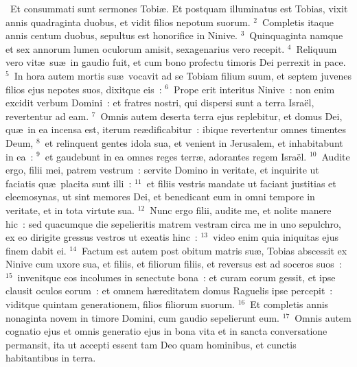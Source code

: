 ~Et consummati sunt sermones Tobi\ae . Et postquam illuminatus est Tobias, vixit annis quadraginta duobus, et vidit filios nepotum suorum.
${}^{2}$~Completis itaque annis centum duobus, sepultus est honorifice in Ninive.
${}^{3}$~Quinquaginta namque et sex annorum lumen oculorum amisit, sexagenarius vero recepit.
${}^{4}$~Reliquum vero vit\ae\ su\ae\ in gaudio fuit, et cum bono profectu timoris Dei perrexit in pace.
${}^{5}$~In hora autem mortis su\ae\ vocavit ad se Tobiam filium suum, et septem juvenes filios ejus nepotes suos, dixitque eis~:
${}^{6}$~Prope erit interitus Ninive~: non enim excidit verbum Domini~: et fratres nostri, qui dispersi sunt a terra Isra\"el, revertentur ad eam.
${}^{7}$~Omnis autem deserta terra ejus replebitur, et domus Dei, qu\ae\ in ea incensa est, iterum re\ae dificabitur~: ibique revertentur omnes timentes Deum,
${}^{8}$~et relinquent gentes idola sua, et venient in Jerusalem, et inhabitabunt in ea~:
${}^{9}$~et gaudebunt in ea omnes reges terr\ae , adorantes regem Isra\"el.
${}^{10}$~Audite ergo, filii mei, patrem vestrum~: servite Domino in veritate, et inquirite ut faciatis qu\ae\ placita sunt illi~:
${}^{11}$~et filiis vestris mandate ut faciant justitias et eleemosynas, ut sint memores Dei, et benedicant eum in omni tempore in veritate, et in tota virtute sua.
${}^{12}$~Nunc ergo filii, audite me, et nolite manere hic~: sed quacumque die sepelieritis matrem vestram circa me in uno sepulchro, ex eo dirigite gressus vestros ut exeatis hinc~:
${}^{13}$~video enim quia iniquitas ejus finem dabit ei.
${}^{14}$~Factum est autem post obitum matris su\ae , Tobias abscessit ex Ninive cum uxore sua, et filiis, et filiorum filiis, et reversus est ad soceros suos~:
${}^{15}$~invenitque eos incolumes in senectute bona~: et curam eorum gessit, et ipse clausit oculos eorum~: et omnem h\ae reditatem domus Raguelis ipse percepit~: viditque quintam generationem, filios filiorum suorum.
${}^{16}$~Et completis annis nonaginta novem in timore Domini, cum gaudio sepelierunt eum.
${}^{17}$~Omnis autem cognatio ejus et omnis generatio ejus in bona vita et in sancta conversatione permansit, ita ut accepti essent tam Deo quam hominibus, et cunctis habitantibus in terra.
